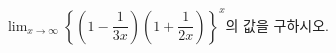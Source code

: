 $\displaystyle\lim_{x\to\infty}\left\{\left(1-\dfrac{1}{3x}\right)\left(1+\dfrac{1}{2x}\right)\right\}^x$의 값을 구하시오.
